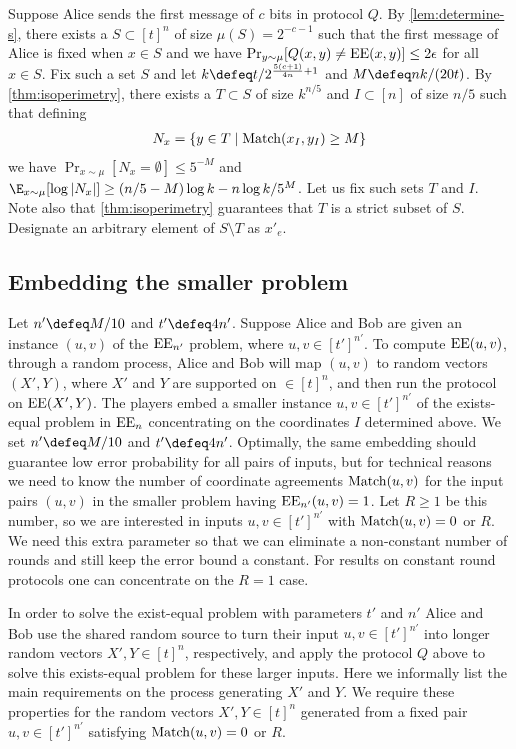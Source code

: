 Suppose Alice sends the first message of $c$ bits in protocol $Q$. 
By \autoref{lem:determine-s}, there exists a $S\subset [t]^n$ of
size $\mu(S)=2^{-c-1}$ such that the first message of Alice is
fixed when $x\in S$ and we have $\Pr_{y\sim
\mu}[Q(x,y)\neq\operatorname{EE}(x,y)]\leq 2\epsilon$ for all $x\in S$. Fix
such a set $S$ and let $k\defeq t/2^{\frac{5(c+1)}{4n} + 1}$ and
$M \defeq nk/(20t)$. By \autoref{thm:isoperimetry}, there exists
a $T\subset S$ of size $k^{n/5}$ and $I\subset[n]$ of size $n/5$
such that defining
\begin{align*}
N_x=\{y\in T\mid\operatorname{Match}(x_I,y_I)\ge M\}
\end{align*}
we have $\Pr_{x\sim\mu}[N_x=\emptyset] \le 5^{-M}$ and
$\E_{x\sim \mu}[\log|N_x|]\geq (n/5-M)\log k - n\log k /5^M$.
Let us fix such sets $T$ and $I$. Note also that
\autoref{thm:isoperimetry} guarantees that $T$ is a strict
subset of $S$. Designate an arbitrary element of $S\setminus T$
as $x'_e$.

\subsection{Embedding the smaller problem}
\label{sec:embed}
Let $n'\defeq M/10$ and $t'\defeq4n'$. Suppose Alice and Bob
are given an instance $(u,v)$ of the $\operatorname{EE}_{n'}$ problem,
where $u,v\in[t']^{n'}$. To compute $\operatorname{EE}(u,v)$, 
through a random process, Alice and Bob will map $(u,v)$ to
random vectors $(X', Y)$, where $X'$ and $Y$ are supported on 
$\in[t]^n$, and then run the protocol on $\operatorname{EE}(X',Y)$.
The players embed a smaller instance $u,v\in[t']^{n'}$ of the
exists-equal problem in $\operatorname{EE}_n$ concentrating on the coordinates
$I$ determined above. We set $n'\defeq M/10$ and $t'\defeq4n'$.
Optimally, the same embedding should guarantee low error
probability for all pairs of inputs, but for technical reasons
we need to know the number of coordinate agreements
$\operatorname{Match}(u,v)$ for the input pairs $(u,v)$ in the smaller problem
having $\operatorname{EE}_{n'}(u,v)=1$. Let $R\ge1$ be this number, so we are
interested in inputs $u,v\in[t']^{n'}$ with $\operatorname{Match}(u,v)=0$ or
$R$. We need this extra parameter so that we can eliminate a
non-constant number of rounds and still keep the error bound a
constant. For results on constant round protocols one can
concentrate on the $R=1$ case.

In order to solve the exist-equal problem with parameters $t'$
and $n'$ Alice and Bob use the shared random source to turn their
input $u,v\in[t']^{n'}$ into longer random vectors
$X',Y\in[t]^n$, respectively, and apply the protocol $Q$ above
to solve this exists-equal problem for these larger inputs. Here
we informally list the main requirements on the process
generating $X'$ and $Y$. We require these properties for the
random vectors $X',Y\in[t]^n$ generated from a fixed pair
$u,v\in[t']^{n'}$ satisfying $\operatorname{Match}(u,v)=0$ or $R$.

